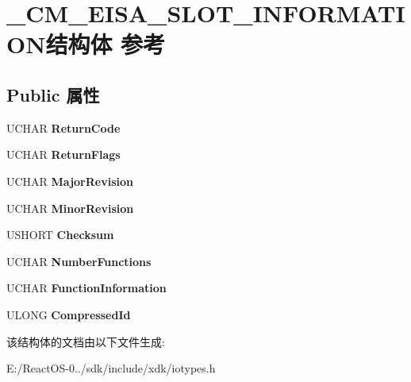 \hypertarget{struct___c_m___e_i_s_a___s_l_o_t___i_n_f_o_r_m_a_t_i_o_n}{}\section{\+\_\+\+C\+M\+\_\+\+E\+I\+S\+A\+\_\+\+S\+L\+O\+T\+\_\+\+I\+N\+F\+O\+R\+M\+A\+T\+I\+O\+N结构体 参考}
\label{struct___c_m___e_i_s_a___s_l_o_t___i_n_f_o_r_m_a_t_i_o_n}
\subsection*{Public 属性}
\begin{DoxyCompactItemize}
\item 
\mbox{\label{struct___c_m___e_i_s_a___s_l_o_t___i_n_f_o_r_m_a_t_i_o_n_a561548f887bea406e45de9b6fb4c2ad3}} 
U\+C\+H\+AR {\bfseries Return\+Code}
\item 
\mbox{\label{struct___c_m___e_i_s_a___s_l_o_t___i_n_f_o_r_m_a_t_i_o_n_a473572b170ba825b73296c96c5ddcbf0}} 
U\+C\+H\+AR {\bfseries Return\+Flags}
\item 
\mbox{\label{struct___c_m___e_i_s_a___s_l_o_t___i_n_f_o_r_m_a_t_i_o_n_a07a632a5e5e9d5035c44f3ffbd5c246d}} 
U\+C\+H\+AR {\bfseries Major\+Revision}
\item 
\mbox{\label{struct___c_m___e_i_s_a___s_l_o_t___i_n_f_o_r_m_a_t_i_o_n_aa889e3bba883a074b494e12a79f7c8f3}} 
U\+C\+H\+AR {\bfseries Minor\+Revision}
\item 
\mbox{\label{struct___c_m___e_i_s_a___s_l_o_t___i_n_f_o_r_m_a_t_i_o_n_a2e8cf0f1fa996cfd4794b7fc9dc085d2}} 
U\+S\+H\+O\+RT {\bfseries Checksum}
\item 
\mbox{\label{struct___c_m___e_i_s_a___s_l_o_t___i_n_f_o_r_m_a_t_i_o_n_a305add3df1625570b40e2ec2fb5d1b39}} 
U\+C\+H\+AR {\bfseries Number\+Functions}
\item 
\mbox{\label{struct___c_m___e_i_s_a___s_l_o_t___i_n_f_o_r_m_a_t_i_o_n_ae153d9b43e0ba8926890df99e9bb846a}} 
U\+C\+H\+AR {\bfseries Function\+Information}
\item 
\mbox{\label{struct___c_m___e_i_s_a___s_l_o_t___i_n_f_o_r_m_a_t_i_o_n_a71ac9da9f34430b444f00870da275e63}} 
U\+L\+O\+NG {\bfseries Compressed\+Id}
\end{DoxyCompactItemize}


该结构体的文档由以下文件生成\+:\begin{DoxyCompactItemize}
\item 
E\+:/\+React\+O\+S-\/0../sdk/include/xdk/iotypes.\+h\end{DoxyCompactItemize}
